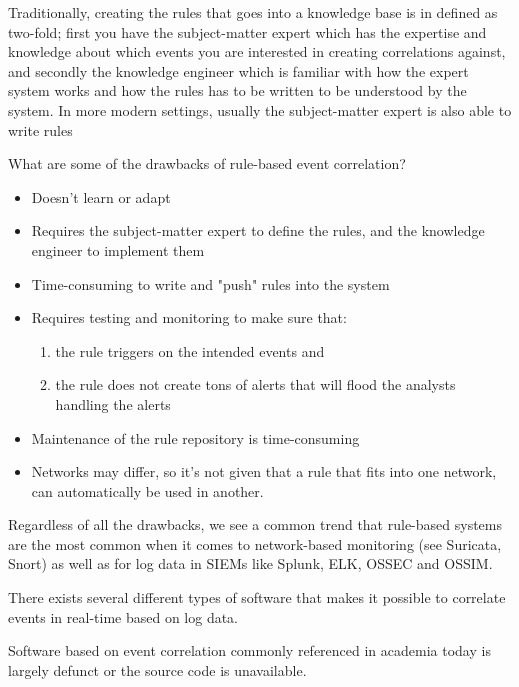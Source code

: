 Traditionally, creating the rules that goes into a knowledge base is in \cite{cronk_1988} defined as two-fold; first you have the subject-matter expert which has the expertise and knowledge about which events you are interested in creating correlations against, and secondly the knowledge engineer which is familiar with how the expert system works and how the rules has to be written to be understood by the system.
In more modern settings, usually the subject-matter expert is also able to write rules

What are some of the drawbacks of rule-based event correlation?

\begin{itemize}
    \item Doesn't learn or adapt
    \item Requires the subject-matter expert to define the rules, and the knowledge engineer to implement them
    \item Time-consuming to write and "push" rules into the system
    \item Requires testing and monitoring to make sure that:
    \begin{enumerate}
        \item the rule triggers on the intended events and
        \item the rule does not create tons of alerts that will flood the analysts handling the alerts
    \end{enumerate} 
    \item Maintenance of the rule repository is time-consuming
    \item Networks may differ, so it's not given that a rule that fits into one network, can automatically be used in another.
\end{itemize}

Regardless of all the drawbacks, we see a common trend that rule-based systems are the most common when it comes to network-based monitoring (see Suricata, Snort) as well as for log data in SIEMs like Splunk, ELK, OSSEC and OSSIM.


There exists several different types of software that makes it possible to correlate events in real-time based on log data.

Software based on event correlation commonly referenced in academia today is largely defunct or the source code is unavailable. 

